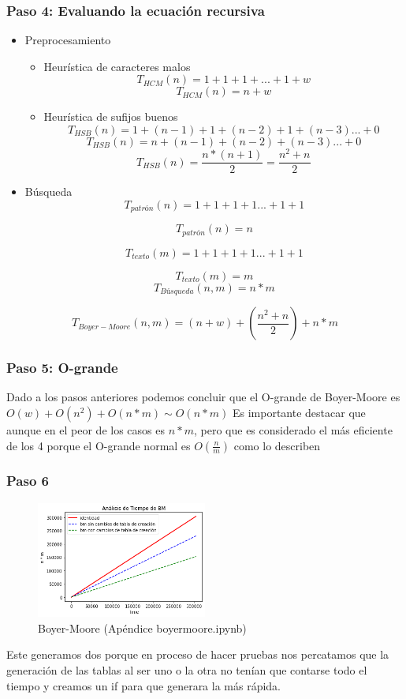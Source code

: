 \subsubsection*{Paso 4: Evaluando la ecuación recursiva}
\begin{itemize}
    \item Preprocesamiento
    \begin{itemize}
        \item Heurística de caracteres malos
        \[T_{HCM}(n) = 1 + 1+ 1+ ... + 1 + w\]
        \[T_{HCM}(n) = n + w\]
        \item Heurística de sufijos buenos
        \[T_{HSB}(n) = 1 +  (n-1) + 1 + (n-2) + 1 + (n-3) ... + 0\]
        \[T_{HSB}(n) = n + (n-1) + (n-2) + (n-3) ... + 0\]
        \[T_{HSB}(n) = \frac{n*(n+1)}{2} = \frac{n^2 + n}{2}\]
    \end{itemize}
    \item Búsqueda
    \[T_{patrón}(n) = 1 + 1 + 1 + 1 ... + 1 + 1\]

    \[T_{patrón}(n) = n \]

    \[T_{texto}(m) = 1 + 1 + 1 + 1 ... + 1 + 1\]

    \[T_{texto}(m) = m \]
    \[T_{Búsqueda}(n,m) = n * m\]
\end{itemize}

\[T_{Boyer-Moore}(n,m) = (n+w) + (\frac{n^2 + n}{2}) + n*m\]

\subsubsection*{Paso 5: O-grande}
Dado a los pasos anteriores podemos concluir que el O-grande de Boyer-Moore es $O(w) + O(n^2) + O(n*m) \sim O(n*m)$
Es importante destacar que aunque en el peor de los casos es $n*m$, pero que es considerado el más eficiente de los 4 porque el O-grande normal es $O(\frac{n}{m})$ como lo describen \cite{TwoWaySM}

\subsubsection*{Paso 6}
\begin{figure} [H]
    \includegraphics[width=0.5\textwidth]{../codigoPythonJupyter/bm/Final.png}
    \caption{Boyer-Moore (Apéndice boyermoore.ipynb)}
    \label{fig:bm}
\end{figure}
Este generamos dos porque en proceso de hacer pruebas nos percatamos que la generación de las tablas al ser uno o la otra no tenían que contarse todo el tiempo y creamos un if para que generara la más rápida.

